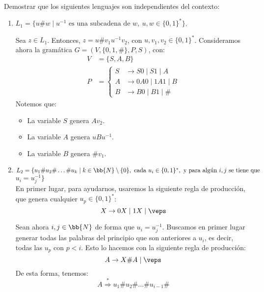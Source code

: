 \begin{ejercicio}\label{ej:1.4.16}
    Demostrar que los siguientes lenguajes son independientes del contexto:
    \begin{enumerate}
        \item $L_1 = \{ u \# w \mid u^{-1} \text{ es una subcadena de } w,~u, w \in \{ 0, 1 \}^* \}$.
        
        Sea $z\in L_1$. Entonces, $z=u\#v_1u^{-1}v_2$, con $u,v_1,v_2\in \{0,1\}^*$. Consideramos ahora la gramática $G=(V,\{0,1,\#\},P,S)$, con:
        \begin{equation*}
            \begin{aligned}
                V &= \{ S, A, B\} \\
                P &= \left\{
                    \begin{aligned}
                        S &\rightarrow S0 \mid S1\mid A \\
                        A & \rightarrow 0A0 \mid 1A1 \mid B \\
                        B &\rightarrow B0 \mid B1 \mid \#
                    \end{aligned}
                \right.
            \end{aligned}
        \end{equation*}
        Notemos que:
        \begin{itemize}
            \item La variable $S$ genera $Av_2$.
            \item La variable $A$ genera $uBu^{-1}$.
            \item La variable $B$ genera $\#v_1$.
        \end{itemize}
        
        \item $L_2 = \{ u_1 \# u_2 \# \ldots \# u_k \mid k\in \bb{N}\setminus \{0\}, \text{ cada } u_i \in \{ 0, 1 \}^*, \text{ y para algún } i,j \text{ se tiene que }$ $u_i=u_j^{-1} \}$\\

        En primer lugar, para ayudarnos, usaremos la siguiente regla de producción, que genera cualquier $u_p\in \{0,1\}^*$:
        \begin{equation*}
            X\to 0X \mid 1X \mid \veps
        \end{equation*}
    
        Sean ahora $i,j\in \bb{N}$ de forma que $u_i=u_j^{-1}$. Buscamos en primer lugar generar todas las palabras del principio que son anteriores a $u_i$, es decir, todas las $u_p$ con $p<i$. Esto lo hacemos con la siguiente regla de producción:
        \begin{equation*}
            A\to X\#A \mid \veps
        \end{equation*}
        De esta forma, tenemos:
        \begin{equation*}
            A \stackrel{\ast}{\Longrightarrow} u_1\#u_2\#\dots\#u_{i-1}\#
        \end{equation*}
    

\end{enumerate}
\end{ejercicio}
